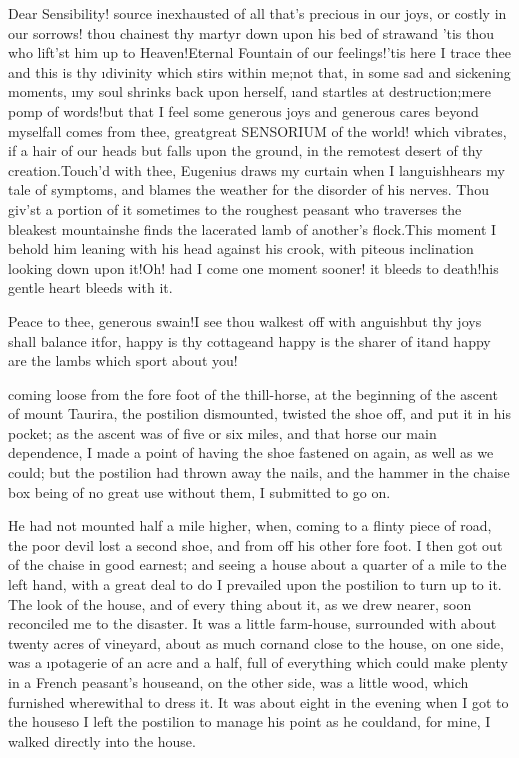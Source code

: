 \documentclass[twoside]{article}
\begin{document}
\tskk Dear Sensibility! source inexhausted
of all that’s precious in our joys, or
costly in our sorrows! thou chainest thy
martyr down upon his bed of straw\tskk and
’tis thou who lift’st him up to
Heaven!\tskk Eternal Fountain of our
feelings!\tskk ’tis here I trace thee\tskk
and this is thy \lqq \i{divinity which stirs
within me};\rqq \tskk not that, in some sad
and sickening moments, \lqq \i{my soul shrinks
back upon herself}, \i{and startles at
destruction};\rqq \tskk mere pomp of
words!\tskk but that I feel some generous
joys and generous cares beyond
myself\tskk all comes from thee,
great\tskk great SENSORIUM of the world!
which vibrates, if a hair of our heads but
falls upon the ground, in the remotest
desert of thy creation.\tskk Touch’d with
thee, Eugenius draws my curtain when I
languish\tskk hears my tale of symptoms,
and blames the weather for the disorder of
his nerves.  Thou giv’st a portion of it
sometimes to the roughest peasant who
traverses the bleakest mountains\tskk he
finds the lacerated lamb of another’s
flock.\tskk This moment I behold him
leaning with his head against his crook,
with piteous inclination looking down upon
it!\tskk Oh! had I come one moment sooner!
it bleeds to death!\tskk his gentle heart
bleeds with it.\tskk 

Peace to thee, generous swain!\tskk I see
thou walkest off with anguish\tskk but
thy joys shall balance it\tskk for, happy
is thy cottage\tskk and happy is the
sharer of it\tskk and happy are the lambs
which sport about you!





\vskip 6pt


 coming loose from the
fore foot of the thill-horse, at the
beginning of the ascent of mount Taurira,
the postilion dismounted, twisted the shoe
off, and put it in his pocket; as the
ascent was of five or six miles, and that
horse our main dependence, I made a point
of having the shoe fastened on again, as
well as we could; but the postilion had
thrown away the nails, and the hammer in
the chaise box being of no great use
without them, I submitted to go on.

He had not mounted half a mile higher,
when, coming to a flinty piece of road,
the poor devil lost a second shoe, and
from off his other fore foot.  I then got
out of the chaise in good earnest; and
seeing a house about a quarter of a mile
to the left hand, with a great deal to do
I prevailed upon the postilion to turn up
to it.  The look of the house, and of
every thing about it, as we drew nearer,
soon reconciled me to the disaster.\tskk
It was a little farm-house, surrounded
with about twenty acres of vineyard, about
as much corn\tskk and close to the house,
on one side, was a \i{potagerie} of an
acre and a half, full of everything which
could make plenty in a French peasant’s
house\tskk and, on the other side, was a
little wood, which furnished wherewithal
to dress it.  It was about eight in the
evening when I got to the house\tskk so I
left the postilion to manage his point as
he could\tskk and, for mine, I walked
directly into the house.
\end{document}
